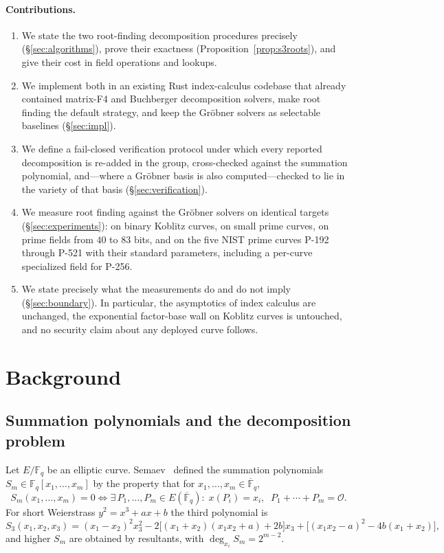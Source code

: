 \documentclass[10pt,a4paper]{article}
\theoremstyle{remark}
\newcommand{\FF}{\mathbb{F}}
\newcommand{\Sem}[1]{S_{#1}}
\begin{document}
\paragraph{Contributions.}
\begin{enumerate}
\item We state the two root-finding decomposition procedures precisely
  (\S\ref{sec:algorithms}), prove their exactness
  (Proposition~\ref{prop:s3roots}), and give their cost in field
  operations and lookups.
\item We implement both in an existing Rust index-calculus codebase that
  already contained matrix-F4 and Buchberger decomposition solvers, make
  root finding the default strategy, and keep the Gr\"obner solvers as
  selectable baselines (\S\ref{sec:impl}).
\item We define a fail-closed verification protocol under which every
  reported decomposition is re-added in the group, cross-checked against
  the summation polynomial, and---where a Gr\"obner basis is also
  computed---checked to lie in the variety of that basis
  (\S\ref{sec:verification}).
\item We measure root finding against the Gr\"obner solvers on identical
  targets (\S\ref{sec:experiments}): on binary Koblitz curves, on small
  prime curves, on prime fields from $40$ to $83$ bits, and on the five
  NIST prime curves P-192 through P-521 with their standard parameters,
  including a per-curve specialized field for P-256.
\item We state precisely what the measurements do and do not imply
  (\S\ref{sec:boundary}). In particular, the asymptotics of index
  calculus are unchanged, the exponential factor-base wall on Koblitz
  curves is untouched, and no security claim about any deployed curve
  follows.
\end{enumerate}

\section{Background}
\label{sec:background}

\subsection{Summation polynomials and the decomposition problem}

Let $E / \FF_q$ be an elliptic curve. Semaev~\cite{semaev2004} defined
the summation polynomials $\Sem{m} \in \FF_q[x_1,\ldots,x_m]$ by the
property that for $x_1,\ldots,x_m \in \overline{\FF}_q$,
\[
  \Sem{m}(x_1,\ldots,x_m) = 0
  \iff
  \exists\, P_1,\ldots,P_m \in E(\overline{\FF}_q):\;
  x(P_i) = x_i,\;\; P_1 + \cdots + P_m = \mathcal{O}.
\]
For short Weierstrass $y^2 = x^3 + ax + b$ the third polynomial is
\begin{equation}
\label{eq:s3}
\Sem{3}(x_1,x_2,x_3) =
  (x_1 - x_2)^2 x_3^2
  - 2\big[(x_1+x_2)(x_1 x_2 + a) + 2b\big] x_3
  + \big[(x_1 x_2 - a)^2 - 4b(x_1+x_2)\big],
\end{equation}
and higher $\Sem{m}$ are obtained by resultants, with
$\deg_{x_i} \Sem{m} = 2^{m-2}$.
\end{document}
